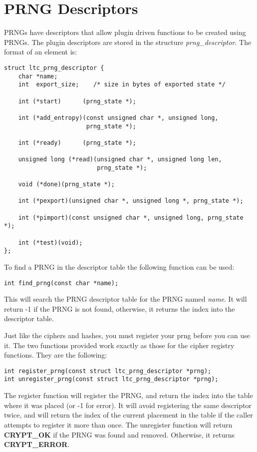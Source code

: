 \documentclass[synpaper]{book}
\newcommand{\mysection}[1]    %
	{                   %
	\section{#1}
   \markboth{\textsf{www.libtom.net}}{\thesection ~ {#1}}
	}
\begin{document}
\mysection{PRNG Descriptors}
PRNGs have descriptors that allow plugin driven functions to be created using PRNGs. The plugin descriptors are stored in the structure \textit{prng\_descriptor}.  The
format of an element is:
\begin{verbatim}
struct ltc_prng_descriptor {
    char *name;
    int  export_size;    /* size in bytes of exported state */

    int (*start)      (prng_state *);

    int (*add_entropy)(const unsigned char *, unsigned long,
                       prng_state *);

    int (*ready)      (prng_state *);

    unsigned long (*read)(unsigned char *, unsigned long len,
                          prng_state *);

    void (*done)(prng_state *);

    int (*pexport)(unsigned char *, unsigned long *, prng_state *);

    int (*pimport)(const unsigned char *, unsigned long, prng_state *);

    int (*test)(void);
};
\end{verbatim}

To find a PRNG in the descriptor table the following function can be used:
\begin{verbatim}
int find_prng(const char *name);
\end{verbatim}
This will search the PRNG descriptor table for the PRNG named \textit{name}.  It will return -1 if the PRNG is not found, otherwise, it returns
the index into the descriptor table.

Just like the ciphers and hashes, you must register your prng before you can use it.  The two functions provided work exactly as those for the cipher registry functions.
They are the following:
 
\begin{verbatim}
int register_prng(const struct ltc_prng_descriptor *prng);
int unregister_prng(const struct ltc_prng_descriptor *prng);
\end{verbatim}

The register function will register the PRNG, and return the index into the table where it was placed (or -1 for error).  It will avoid registering the same
descriptor twice, and will return the index of the current placement in the table if the caller attempts to register it more than once.  The unregister function
will return \textbf{CRYPT\_OK} if the PRNG was found and removed.  Otherwise, it returns \textbf{CRYPT\_ERROR}.
\end{document}
